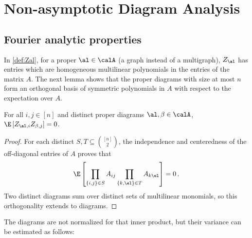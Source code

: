 \documentclass[12pt]{article}
\begin{document}

{\footnotesize}

\appendix

\section{Non-asymptotic Diagram Analysis}
\label{app:non-asymptotic}

\subsection{Fourier analytic properties}
\label{sec:fourier}

In \cref{def:Zal}, for a proper $\al \in \calA$ (a graph instead of a multigraph), $Z_\al$ has entries which are homogeneous multilinear polynomials in the entries of the matrix $A$.
The next lemma shows that the proper diagrams with size at most $n$ form an orthogonal basis of
symmetric polynomials in $A$ with respect to the expectation over $A$.

\begin{lemma}\label{lem:orthogonality}
    For all $i,j \in [n]$ and distinct proper diagrams $\al, \beta \in \calA$, $\E \left[Z_{\al,i}Z_{\beta,j}\right] = 0$.
\end{lemma}
\begin{proof}
    For each distinct $S, T \subseteq \binom{[n]}{2}$, the independence and centeredness of
    the off-diagonal entries of $A$ proves that
    \[
        \E \left[\prod_{\{i,j\} \in S} A_{ij} \prod_{\{k,\el\} \in T} A_{k\el}\right] = 0\,.
    \]
    Two distinct diagrams sum over distinct sets of multilinear monomials,
    so this orthogonality extends to diagrams.
\end{proof}

The diagrams are not normalized for that inner product, but their variance can be estimated as follows:
\end{document}
